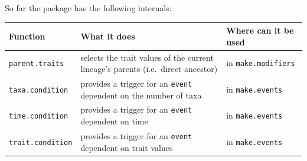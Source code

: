 \documentclass[
]{book}
\begin{document}
So far the package has the following internals:

\begin{longtable}[]{@{}lll@{}}
\toprule
\begin{minipage}[b]{0.20\columnwidth}\raggedright
Function\strut
\end{minipage} & \begin{minipage}[b]{0.28\columnwidth}\raggedright
What it does\strut
\end{minipage} & \begin{minipage}[b]{0.43\columnwidth}\raggedright
Where can it be used\strut
\end{minipage}\tabularnewline
\midrule
\endhead
\begin{minipage}[t]{0.20\columnwidth}\raggedright
\texttt{parent.traits}\strut
\end{minipage} & \begin{minipage}[t]{0.28\columnwidth}\raggedright
selects the trait values of the current lineage's parents (i.e.~direct ancestor)\strut
\end{minipage} & \begin{minipage}[t]{0.43\columnwidth}\raggedright
in \texttt{make.modifiers}\strut
\end{minipage}\tabularnewline
\begin{minipage}[t]{0.20\columnwidth}\raggedright
\texttt{taxa.condition}\strut
\end{minipage} & \begin{minipage}[t]{0.28\columnwidth}\raggedright
provides a trigger for an \texttt{event} dependent on the number of taxa\strut
\end{minipage} & \begin{minipage}[t]{0.43\columnwidth}\raggedright
in \texttt{make.events}\strut
\end{minipage}\tabularnewline
\begin{minipage}[t]{0.20\columnwidth}\raggedright
\texttt{time.condition}\strut
\end{minipage} & \begin{minipage}[t]{0.28\columnwidth}\raggedright
provides a trigger for an \texttt{event} dependent on time\strut
\end{minipage} & \begin{minipage}[t]{0.43\columnwidth}\raggedright
in \texttt{make.events}\strut
\end{minipage}\tabularnewline
\begin{minipage}[t]{0.20\columnwidth}\raggedright
\texttt{trait.condition}\strut
\end{minipage} & \begin{minipage}[t]{0.28\columnwidth}\raggedright
provides a trigger for an \texttt{event} dependent on trait values\strut
\end{minipage} & \begin{minipage}[t]{0.43\columnwidth}\raggedright
in \texttt{make.events}\strut
\end{minipage}\tabularnewline
\bottomrule
\end{longtable}
\end{document}
